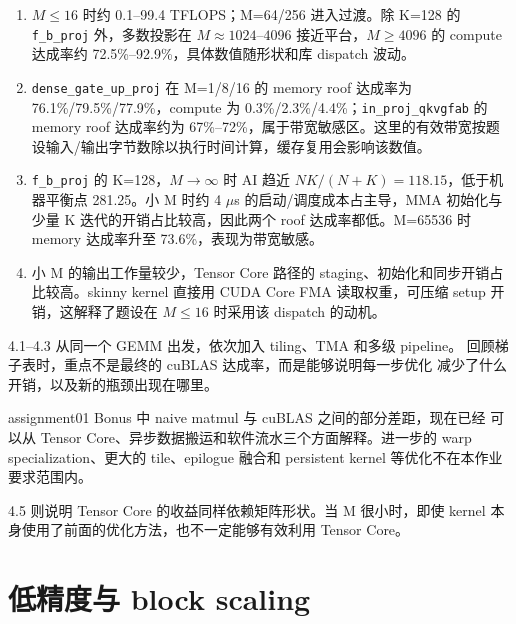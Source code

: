 \documentclass[11pt,a4paper,fontset=fandol]{ctexart}
\begin{document}
\begin{answer}

\begin{enumerate}
\def\labelenumi{(\alph{enumi})}
\item
  \(M\le16\) 时约 0.1--99.4 TFLOPS；M=64/256 进入过渡。除 K=128 的
  \texttt{f\_\allowbreak{}b\_\allowbreak{}proj} 外，多数投影在
  \(M\approx1024\)--\(4096\) 接近平台，\(M\ge4096\) 的 compute 达成率约
  72.5\%--92.9\%，具体数值随形状和库 dispatch 波动。
\item
  \texttt{dense\_\allowbreak{}gate\_\allowbreak{}up\_\allowbreak{}proj}
  在 M=1/8/16 的 memory roof 达成率为 76.1\%/79.5\%/77.9\%，compute 为
  0.3\%/2.3\%/4.4\%；\texttt{in\_\allowbreak{}proj\_\allowbreak{}qkvgfab}
  的 memory roof 达成率约为
  67\%--72\%，属于带宽敏感区。这里的有效带宽按题设输入/输出字节数除以执行时间计算，缓存复用会影响该数值。
\item
  \texttt{f\_\allowbreak{}b\_\allowbreak{}proj} 的 K=128，\(M\to\infty\)
  时 AI 趋近 \(NK/(N+K)=118.15\)，低于机器平衡点 281.25。小 M 时约 4
  \(\mu\)s 的启动/调度成本占主导，MMA 初始化与少量 K
  迭代的开销占比较高，因此两个 roof 达成率都低。M=65536 时 memory
  达成率升至 73.6\%，表现为带宽敏感。
\item
  小 M 的输出工作量较少，Tensor Core 路径的
  staging、初始化和同步开销占比较高。skinny kernel 直接用 CUDA Core FMA
  读取权重，可压缩 setup 开销，这解释了题设在 \(M\le16\) 时采用该
  dispatch 的动机。
\end{enumerate}

\end{answer}

\begin{lookback}

4.1--4.3 从同一个 GEMM 出发，依次加入 tiling、TMA 和多级 pipeline。
回顾梯子表时，重点不是最终的 cuBLAS 达成率，而是能够说明每一步优化
减少了什么开销，以及新的瓶颈出现在哪里。

assignment01 Bonus 中 naive matmul 与 cuBLAS 之间的部分差距，现在已经
可以从 Tensor Core、异步数据搬运和软件流水三个方面解释。进一步的 warp
specialization、更大的 tile、epilogue 融合和 persistent kernel
等优化不在本作业要求范围内。

4.5 则说明 Tensor Core 的收益同样依赖矩阵形状。当 M 很小时，即使 kernel
本身使用了前面的优化方法，也不一定能够有效利用 Tensor Core。

\end{lookback}

\section{低精度与 block
scaling}\label{ux4f4eux7cbeux5ea6ux4e0e-block-scaling}
\end{document}
